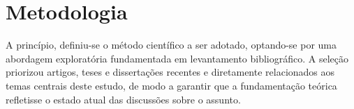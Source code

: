\section{Metodologia}
\label{chap:metodologia}
A princípio, definiu-se o método científico a ser adotado, optando-se por uma abordagem exploratória fundamentada em levantamento bibliográfico. A seleção priorizou artigos, teses e dissertações recentes e diretamente relacionados aos temas centrais deste estudo, de modo a garantir que a fundamentação teórica refletisse o estado atual das discussões sobre o assunto.

